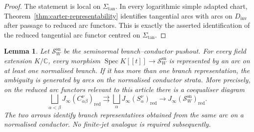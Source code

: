 \documentclass[11pt]{amsart}
\numberwithin{equation}{section}
\theoremstyle{plain}
\newtheorem{Lemma}[Theorem]{Lemma}
\theoremstyle{definition}
\newcommand{\Spec}{\operatorname{Spec}}
\newcommand{\sn}{\mathrm{sn}}
\newcommand{\Sigmatan}{\Sigma_{\mathrm{tan}}}
\newcommand{\red}{\mathrm{red}}
\newcommand{\Dinv}{D_{\mathrm{inv}}}
\newcommand{\bC}{\mathbb C}
\newcommand{\sS}{\mathscr S}
\begin{document}
\begin{proof}
The statement is local on \(\Sigmatan\).  In every logarithmic simple adapted
chart, Theorem~\ref{thm:carter-representability} identifies tangential arcs
with arcs on \(\Dinv\) after passage to reduced arc functors.  This is
exactly the asserted identification of the reduced tangential arc functor
centred on \(\Sigmatan\).
\end{proof}
\begin{Lemma}
\label{lem:arcs-pushout}
Let $\sS_W^{\sn}$ be the seminormal branch--conductor pushout.  For every
field extension $K/\bC$, every morphism $\Spec K[[t]]\to \sS_W^{\sn}$
is represented by an arc on at least one normalised branch.  If it has more
than one branch representation, the ambiguity is generated by arcs on the
normalised conductor strata.  More precisely, on the reduced arc functors
relevant to this article there is a coequaliser diagram
\[
\bigsqcup_{\alpha<\beta}J_\infty(C_{\alpha\beta}^\nu)_{\red}
\rightrightarrows
\bigsqcup_\alpha J_\infty(S_\alpha^\nu)_{\red}
\longrightarrow
J_\infty(\sS_W^{\sn})_{\red}.
\]
The two arrows identify branch representatives obtained from the same arc on
a normalised conductor.  No finite-jet analogue is required subsequently.
\end{Lemma}
\end{document}
